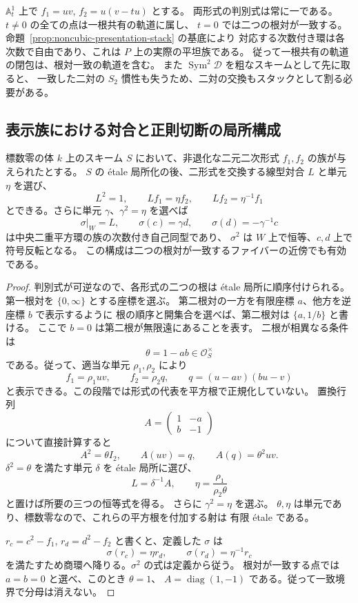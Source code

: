 \begin{example}[共有根から根対一致への特殊化]
\label{ex:noncubic-specialization}
$\mathbb A^1_t$ 上で $f_1=uv$, $f_2=u(v-tu)$ とする。
両形式の判別式は常に一である。$t\ne0$ の全ての点は一根共有の軌道に属し、
$t=0$ では二つの根対が一致する。命題~\ref{prop:noncubic-presentation-stack} の基底により
対応する次数付き環は各次数で自由であり、これは $P$ 上の実際の平坦族である。
従って一根共有の軌道の閉包は、根対一致の軌道を含む。
また $\operatorname{Sym}^2\mathcal D$ を粗なスキームとして先に取ると、
一致した二対の $S_2$ 慣性も失うため、二対の交換もスタックとして割る必要がある。
\end{example}

\subsection{表示族における対合と正則切断の局所構成}
\label{subsec:noncubic-relative-root}

\begin{lemma}
\label{lem:noncubic-local-exchange}
標数零の体 $k$ 上のスキーム $S$ において、非退化な二元二次形式
$f_1,f_2$ の族が与えられたとする。
$S$ の \'etale 局所化の後、二形式を交換する線型対合 $L$ と単元 $\eta$ を選び、
\[
 L^2=1,\qquad Lf_1=\eta f_2,\qquad Lf_2=\eta^{-1}f_1
\]
とできる。さらに単元 $\gamma$、$\gamma^2=\eta$ を選べば
\[
 \sigma|_W=L,\qquad \sigma(c)=\gamma d,\qquad
 \sigma(d)=-\gamma^{-1}c
\]
は中央二重平方環の族の次数付き自己同型であり、
$\sigma^2$ は $W$ 上で恒等、$c,d$ 上で符号反転となる。
この構成は二つの根対が一致するファイバーの近傍でも有効である。
\end{lemma}

\begin{proof}
判別式が可逆なので、各形式の二つの根は \'etale 局所に順序付けられる。
第一根対を $\{0,\infty\}$ とする座標を選ぶ。
第二根対の一方を有限座標 $a$、他方を逆座標 $b$ で表示するように
根の順序と開集合を選べば、第二根対は $\{a,1/b\}$ と書ける。
ここで $b=0$ は第二根が無限遠にあることを表す。
二根が相異なる条件は
\[
 \theta=1-ab\in\mathcal O_S^\times
\]
である。従って、適当な単元 $\rho_1,\rho_2$ により
\[
 f_1=\rho_1uv,\qquad
 f_2=\rho_2 q,\qquad q=(u-av)(bu-v)
\]
と表示できる。この段階では形式の代表を平方根で正規化していない。
置換行列
\[
 A=\begin{pmatrix}1&-a\\ b&-1\end{pmatrix}
\]
について直接計算すると
\[
 A^2=\theta I_2,\qquad A(uv)=q,\qquad A(q)=\theta^2uv.
\]
$\delta^2=\theta$ を満たす単元 $\delta$ を \'etale 局所に選び、
\[
 L=\delta^{-1}A,\qquad \eta=\frac{\rho_1}{\rho_2\theta}
\]
と置けば所要の三つの恒等式を得る。
さらに $\gamma^2=\eta$ を選ぶ。
$\theta,\eta$ は単元であり、標数零なので、これらの平方根を付加する射は
有限 \'etale である。

$r_c=c^2-f_1$, $r_d=d^2-f_2$ と書くと、定義した $\sigma$ は
\[
 \sigma(r_c)=\eta r_d,\qquad
 \sigma(r_d)=\eta^{-1}r_c
\]
を満たすため商環へ降りる。$\sigma^2$ の式は定義から従う。
根対が一致する点では $a=b=0$ と選べ、このとき $\theta=1$、
$A=\operatorname{diag}(1,-1)$ である。従って一致境界で分母は消えない。
\end{proof}

